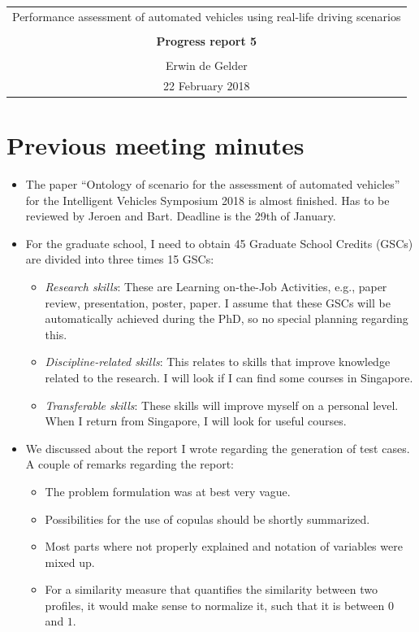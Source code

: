\documentclass[10pt,final,a4paper,oneside,onecolumn]{article}
\newcommand{\progressreportnumber}{5}
\renewcommand{\author}{Erwin de Gelder}
\renewcommand{\date}{22 February 2018}
\renewcommand{\title}{Performance assessment of automated vehicles using real-life driving scenarios}
\begin{document}
	
\begin{center}
	\begin{tabular}{c}
		\title \\ \\
		\textbf{\huge Progress report \progressreportnumber} \\ \\
		\author \\ 
		\date
	\end{tabular}
\end{center}

\section{Previous meeting minutes}

\begin{itemize}
	\item The paper ``Ontology of scenario for the assessment of automated vehicles'' for the Intelligent Vehicles Symposium 2018 is almost finished. Has to be reviewed by Jeroen and Bart. Deadline is the 29th of January.
	\item For the graduate school, I need to obtain 45 Graduate School Credits (GSCs) are divided into three times 15 GSCs:
	\begin{itemize}
		\item \emph{Research skills}: These are Learning on-the-Job Activities, e.g., paper review, presentation, poster, paper. I assume that these GSCs will be automatically achieved during the PhD, so no special planning regarding this.
		\item \emph{Discipline-related skills}: This relates to skills that improve knowledge related to the research. I will look if I can find some courses in Singapore.
		\item \emph{Transferable skills}: These skills will improve myself on a personal level. When I return from Singapore, I will look for useful courses.
	\end{itemize}
	\item We discussed about the report I wrote regarding the generation of test cases. A couple of remarks regarding the report:
	\begin{itemize}
		\item The problem formulation was at best very vague.
		\item Possibilities for the use of copulas should be shortly summarized.
		\item Most parts where not properly explained and notation of variables were mixed up.
		\item For a similarity measure that quantifies the similarity between two profiles, it would make sense to normalize it, such that it is between $0$ and $1$.
	\end{itemize}
\end{itemize}
\end{document}

